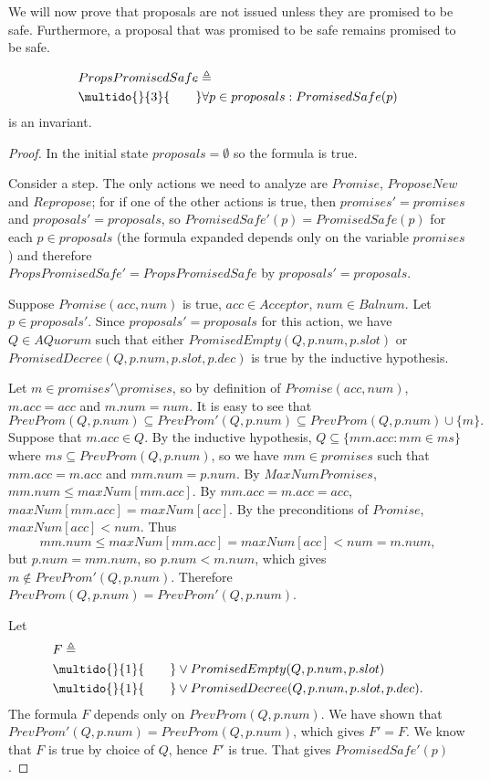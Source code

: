 \documentclass[12pt,a4paper,en]{pracamgr}
\newcommand{\ind}[1]{\multido{}{#1}{\qquad}}
\begin{document}
We will now prove that proposals are not issued unless they are promised to be safe. Furthermore, a proposal that was promised to be safe remains promised to be safe.

\begin{lemma}
    \begin{align*}
        & PropsPromisedSafe \triangleq\\
        & \ind{3} \forall p \in proposals: PromisedSafe(p)
    \end{align*}
    is an invariant.
\end{lemma}
\begin{proof}
    In the initial state $proposals = \emptyset$ so the formula is true.

    Consider a step. The only actions we need to analyze are $Promise$, $ProposeNew$ and $Repropose$; for if one of the other actions is true, then $promises' = promises$ and $proposals' = proposals$, so $PromisedSafe'(p) = PromisedSafe(p)$ for each $p \in proposals$ (the formula expanded depends only on the variable $promises$) and therefore\\
    $PropsPromisedSafe' = PropsPromisedSafe$ by $proposals' = proposals$.

    Suppose $Promise(acc, num)$ is true, $acc \in Acceptor$, $num \in Balnum$. Let $p \in proposals'$. Since $proposals' = proposals$ for this action, we have $Q \in AQuorum$ such that either
    $PromisedEmpty(Q, p.num, p.slot)$ or $PromisedDecree(Q, p.num, p.slot, p.dec)$ is true by the inductive hypothesis.

    Let $m \in promises' \setminus promises$, so by definition of $Promise(acc, num)$, $m.acc = acc$ and $m.num = num$.
    It is easy to see that
    $$ PrevProm(Q, p.num) \subseteq PrevProm'(Q, p.num) \subseteq PrevProm(Q, p.num) \cup \{m\}. $$
    Suppose that $m.acc \in Q$. By the inductive hypothesis, $Q \subseteq \{mm.acc: mm \in ms\}$ where $ms \subseteq PrevProm(Q, p.num)$, so we have $mm \in promises$ such that $mm.acc = m.acc$ and $mm.num = p.num$. By $MaxNumPromises$, $mm.num \le maxNum[mm.acc]$. By $mm.acc = m.acc = acc$, $maxNum[mm.acc] = maxNum[acc]$. By the preconditions of $Promise$, $maxNum[acc] < num$. Thus
    $$ mm.num \le maxNum[mm.acc] = maxNum[acc] < num = m.num, $$
    but $p.num = mm.num$, so $p.num < m.num$, which gives $m \notin PrevProm'(Q, p.num)$. Therefore $PrevProm(Q, p.num) = PrevProm'(Q, p.num)$.

    Let
    \begin{align*}
        & F \triangleq\\
        & \ind{1} \lor PromisedEmpty(Q, p.num, p.slot)\\
        & \ind{1} \lor PromisedDecree(Q, p.num, p.slot, p.dec).
    \end{align*}
    The formula $F$ depends only on $PrevProm(Q, p.num)$. We have shown that\\
    $PrevProm'(Q, p.num) = PrevProm(Q, p.num)$, which gives $F' = F$. We know that $F$ is true by choice of $Q$, hence $F'$ is true. That gives $PromisedSafe'(p)$.


\end{proof}
\end{document}
